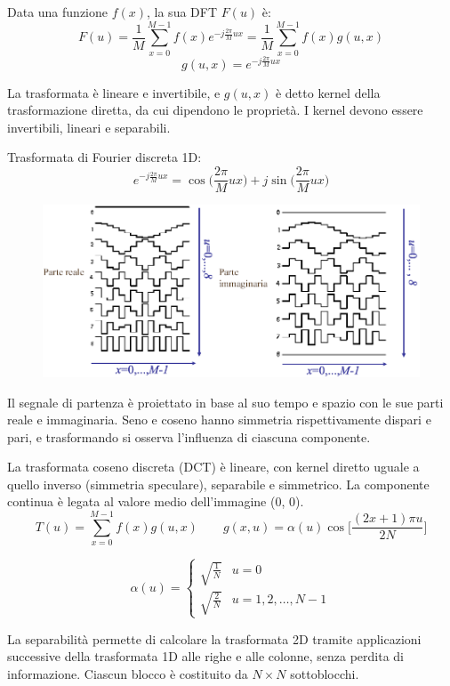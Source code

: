 Data una funzione $f(x)$, la sua DFT $F(u)$ è:
$$F(u) = \frac{1}{M} \sum_{x=0}^{M- 1}f(x)e^{-j\frac{2\pi}{M}ux} = \frac{1}{M} \sum_{x=0}^{M- 1}f(x)g(u, x)$$
$$g(u, x) = e^{-j\frac{2\pi}{M}ux}$$

La trasformata è lineare e invertibile, e $g(u, x)$ è detto kernel della trasformazione diretta, da cui dipendono le proprietà. I kernel devono essere invertibili, lineari e separabili.

Trasformata di Fourier discreta 1D:
$$e^{-j\frac{2\pi}{M}ux} = \cos\big(\frac{2\pi}{M}ux\big) + j\sin\big(\frac{2\pi}{M}ux\big)$$

\begin{figure}[h]
	\centering
	\includegraphics[scale=0.48]{Lezioni/Immagini/ondequadrate}
\end{figure}

Il segnale di partenza è proiettato in base al suo tempo e spazio con le sue parti reale e immaginaria. Seno e coseno hanno simmetria rispettivamente dispari e pari, e trasformando si osserva l'influenza di ciascuna componente. 

La trasformata coseno discreta (DCT) è lineare, con kernel diretto uguale a quello inverso (simmetria speculare), separabile e simmetrico. La componente continua è legata al valore medio dell'immagine (0, 0). 
$$T(u) = \sum_{x=0}^{M- 1}f(x)g(u, x) \qquad g(x, u) = \alpha(u) \cos\Big[\frac{(2x + 1)\pi u}{2N}\Big]$$

$$\alpha(u) = \begin{cases}
\sqrt{\frac{1}{N}} & u = 0 \\
\sqrt{\frac{2}{N}} & u = 1, 2, \dots, N - 1^{}
\end{cases}$$

La separabilità permette di calcolare la trasformata 2D tramite applicazioni successive della trasformata 1D alle righe e alle colonne, senza perdita di informazione. Ciascun blocco è costituito da $N \times N$ sottoblocchi.

